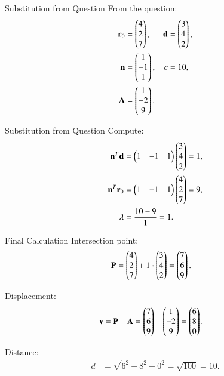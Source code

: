 \documentclass{beamer}
\begin{document}
	
	\begin{frame}{Substitution from Question}
	From the question:
	\begin{align}
	    \mathbf{r}_0 &= \begin{pmatrix}4 \\ 2 \\ 7\end{pmatrix}, &
	    \mathbf{d} &= \begin{pmatrix}3 \\ 4 \\ 2\end{pmatrix}, \\
	    \mathbf{n} &= \begin{pmatrix}1 \\ -1 \\ 1\end{pmatrix}, &
	    c &= 10, \\
	    \mathbf{A} &= \begin{pmatrix}1 \\ -2 \\ 9\end{pmatrix}.
	\end{align}
	\end{frame}
    \begin{frame}{Substitution from Question}
    Compute:
	\begin{align}
	    \mathbf{n}^T \mathbf{d} &= \begin{pmatrix}1 & -1 & 1\end{pmatrix}\begin{pmatrix}3 \\ 4 \\ 2\end{pmatrix} = 1, \\
	    \mathbf{n}^T \mathbf{r}_0 &= \begin{pmatrix}1 & -1 & 1\end{pmatrix}\begin{pmatrix}4 \\ 2 \\ 7\end{pmatrix} = 9, \\
	    \lambda &= \frac{10 - 9}{1} = 1.
	\end{align}
	\end{frame}
	
	
	\begin{frame}{Final Calculation}
	Intersection point:
	\begin{align}
	    \mathbf{P} &= \begin{pmatrix}4 \\ 2 \\ 7\end{pmatrix} + 1\cdot \begin{pmatrix}3 \\ 4 \\ 2\end{pmatrix} = \begin{pmatrix}7 \\ 6 \\ 9\end{pmatrix}.
	\end{align}
	
	Displacement:
	\begin{align}
	    \mathbf{v} &= \mathbf{P} - \mathbf{A} = \begin{pmatrix}7 \\ 6 \\ 9\end{pmatrix} - \begin{pmatrix}1 \\ -2 \\ 9\end{pmatrix} = \begin{pmatrix}6 \\ 8 \\ 0\end{pmatrix}.
	\end{align}
	
	Distance:
	\begin{align}
	    d &= \sqrt{6^2 + 8^2 + 0^2} = \sqrt{100} = 10.
	\end{align}
	\end{frame}
	
\end{document}
